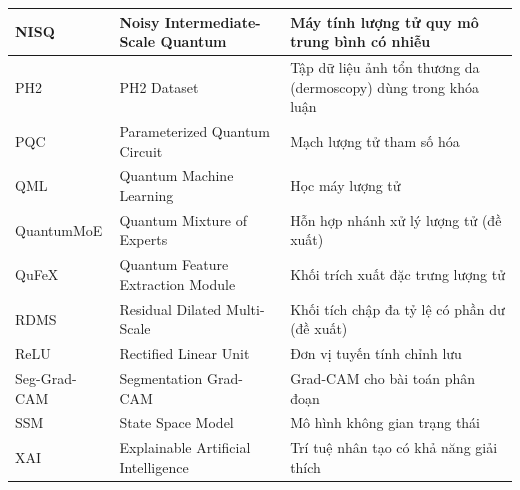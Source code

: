 \begin{center}
\begin{longtable}{|p{2.4cm}|p{5.4cm}|p{5.4cm}|}
NISQ & Noisy Intermediate-Scale Quantum & Máy tính lượng tử quy mô trung bình có nhiễu \\ \hline
PH2 & PH2 Dataset & Tập dữ liệu ảnh tổn thương da (dermoscopy) dùng trong khóa luận \\ \hline
PQC & Parameterized Quantum Circuit & Mạch lượng tử tham số hóa \\ \hline
QML & Quantum Machine Learning & Học máy lượng tử \\ \hline
Quantum\-MoE & Quantum Mixture of Experts & Hỗn hợp nhánh xử lý lượng tử (đề xuất) \\ \hline
QuFeX & Quantum Feature Extraction Module & Khối trích xuất đặc trưng lượng tử \\ \hline
RDMS & Residual Dilated Multi-Scale & Khối tích chập đa tỷ lệ có phần dư (đề xuất) \\ \hline
ReLU & Rectified Linear Unit & Đơn vị tuyến tính chỉnh lưu \\ \hline
Seg-Grad-CAM & Segmentation Grad-CAM & Grad-CAM cho bài toán phân đoạn \\ \hline
SSM & State Space Model & Mô hình không gian trạng thái \\ \hline
XAI & Explainable Artificial Intelligence & Trí tuệ nhân tạo có khả năng giải thích \\ \hline

\end{longtable}
\end{center}

\vspace{0.5cm}

\setlength{\LTpost}{0pt}
\setlength{\LTpre}{0pt}

